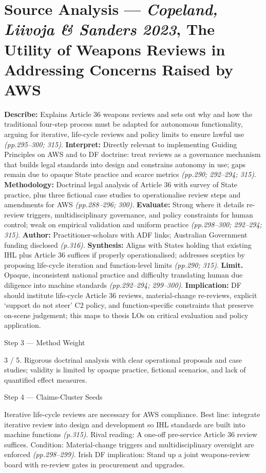 \section*{Source Analysis — \textit{Copeland, Liivoja \& Sanders 2023}, The Utility of Weapons Reviews in Addressing Concerns Raised by AWS}
\textbf{Describe:} Explains Article 36 weapons reviews and sets out why and how the traditional four-step process must be adapted for autonomous functionality, arguing for iterative, life-cycle reviews and policy limits to ensure lawful use \emph{(pp.295–300; 315)}.
\textbf{Interpret:} Directly relevant to implementing Guiding Principles on AWS and to DF doctrine: treat reviews as a governance mechanism that builds legal standards into design and constrains autonomy in use; gaps remain due to opaque State practice and scarce metrics \emph{(pp.290; 292–294; 315)}.
\textbf{Methodology:} Doctrinal legal analysis of Article 36 with survey of State practice, plus three fictional case studies to operationalise review steps and amendments for AWS \emph{(pp.288–296; 300)}.
\textbf{Evaluate:} Strong where it details re-review triggers, multidisciplinary governance, and policy constraints for human control; weak on empirical validation and uniform practice \emph{(pp.298–300; 292–294; 315)}.
\textbf{Author:} Practitioner-scholars with ADF links; Australian Government funding disclosed \emph{(p.316)}.
\textbf{Synthesis:} Aligns with States holding that existing IHL plus Article 36 suffices if properly operationalised; addresses sceptics by proposing life-cycle iteration and function-level limits \emph{(pp.290; 315)}.
\textbf{Limit.} Opaque, inconsistent national practice and difficulty translating human due diligence into machine standards \emph{(pp.292–294; 299–300)}. \textbf{Implication:} DF should institute life-cycle Article 36 reviews, material-change re-reviews, explicit ‘support do not steer’ C2 policy, and function-specific constraints that preserve on-scene judgement; this maps to thesis LOs on critical evaluation and policy application.

Step 3 — Method Weight

3 / 5. Rigorous doctrinal analysis with clear operational proposals and case studies; validity is limited by opaque practice, fictional scenarios, and lack of quantified effect measures.

Step 4 — Claims-Cluster Seeds

Iterative life-cycle reviews are necessary for AWS compliance.
Best line: integrate iterative review into design and development so IHL standards are built into machine functions \emph{(p.315)}.
Rival reading: A one-off pre-service Article 36 review suffices.
Condition: Material-change triggers and multidisciplinary oversight are enforced \emph{(pp.298–299)}.
Irish DF implication: Stand up a joint weapons-review board with re-review gates in procurement and upgrades.


